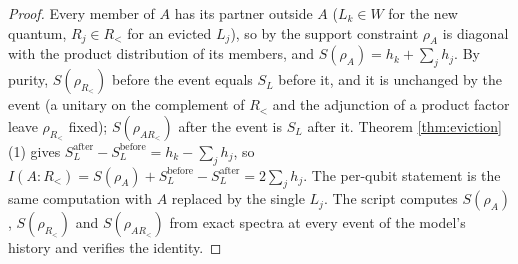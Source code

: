 \documentclass[11pt]{article}
\theoremstyle{definition}
\begin{document}
\begin{proof}
Every member of $A$ has its partner outside $A$ ($L_k \in W$ for the new quantum, $R_j \in R_{<}$ for an evicted $L_j$), so by the support constraint $\rho_A$ is diagonal with the product distribution of its members, and $S(\rho_A) = h_k + \sum_j h_j$. By purity, $S(\rho_{R_<})$ before the event equals $S_L$ before it, and it is unchanged by the event (a unitary on the complement of $R_<$ and the adjunction of a product factor leave $\rho_{R_<}$ fixed); $S(\rho_{AR_<})$ after the event is $S_L$ after it. Theorem \ref{thm:eviction}(1) gives $S_L^{\mathrm{after}} - S_L^{\mathrm{before}} = h_k - \sum_j h_j$, so $I(A{:}R_<) = S(\rho_A) + S_L^{\mathrm{before}} - S_L^{\mathrm{after}} = 2\sum_j h_j$. The per-qubit statement is the same computation with $A$ replaced by the single $L_j$. The script computes $S(\rho_A)$, $S(\rho_{R_<})$ and $S(\rho_{AR_<})$ from exact spectra at every event of the model's history and verifies the identity.
\end{proof}
\end{document}
